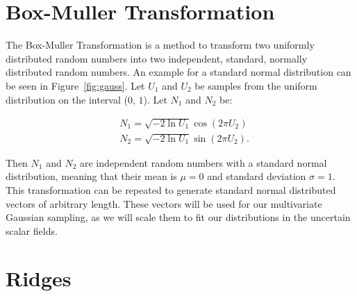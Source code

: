 \section{Box-Muller Transformation}\label{sec:BM}

The Box-Muller Transformation is a method to transform two uniformly
distributed random numbers into two independent, standard, normally
distributed random numbers. An example for a standard normal
distribution can be seen in Figure~\ref{fig:gauss}. Let $U_1$ and $U_2$
be samples from the uniform distribution on the interval ($0$, $1$). Let
$N_1$ and $N_2$ be:

\begin{align}
  &N_1 = \sqrt{-2 \ln{U_1}} \cos (2 \pi U_2) \\
  &N_2 = \sqrt{-2 \ln{U_1}} \sin (2 \pi U_2).
\end{align}

\noindent Then $N_1$ and $N_2$ are independent random numbers with a
standard normal distribution, meaning that their mean is $\mu = 0$ and
standard deviation $\sigma = 1$. This transformation can be repeated to
generate standard normal distributed vectors of arbitrary length. These
vectors will be used for our multivariate Gaussian sampling, as we will
scale them to fit our distributions in the uncertain scalar fields.

\section{Ridges}\label{sec:Ridges}

